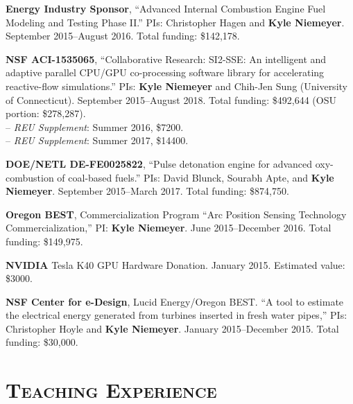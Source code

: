 \documentclass[margin,line,11pt]{res}
\newcommand*{\doi}[1]{\href{https://doi.org/#1}{\nolinkurl{https://doi.org/#1}}}
\begin{document}
\begin{resume}
\textbf{Energy Industry Sponsor}, ``Advanced Internal Combustion Engine Fuel Modeling and Testing Phase II.'' PIs: Christopher Hagen and \textbf{Kyle Niemeyer}. September 2015--August 2016. Total funding: \$142,178.

\textbf{NSF ACI-1535065}, ``Collaborative Research: SI2-SSE: An intelligent and adaptive parallel CPU\slash GPU co-processing software library for accelerating reactive-flow simulations.''
PIs: \textbf{Kyle Niemeyer} and Chih-Jen Sung (University of Connecticut).
September 2015--August 2018. Total funding: \$492,644 (OSU portion: \$278,287). \\
-- \textit{REU Supplement}: Summer 2016, \$7200. \\
-- \textit{REU Supplement}: Summer 2017, \$14400.

\textbf{DOE\slash NETL DE-FE0025822}, ``Pulse detonation engine for advanced oxy-combustion of coal-based fuels.'' PIs: David Blunck, Sourabh Apte, and \textbf{Kyle Niemeyer}. September 2015--March 2017. Total funding: \$874,750.

\textbf{Oregon BEST}, Commercialization Program ``Arc Position Sensing Technology Commercialization,'' PI: \textbf{Kyle Niemeyer}. June 2015--December 2016. Total funding: \$149,975.

\textbf{NVIDIA} Tesla K40 GPU Hardware Donation. January 2015. Estimated value: \$3000.

\textbf{NSF Center for e-Design}, Lucid Energy\slash Oregon BEST. ``A tool to estimate the electrical energy generated from turbines inserted in fresh water pipes,'' PIs: Christopher Hoyle and \textbf{Kyle Niemeyer}. January 2015--December 2015. Total funding: \$30,000.


%
%
%

\section{\textsc{Teaching Experience}}


\end{resume}
\end{document}
